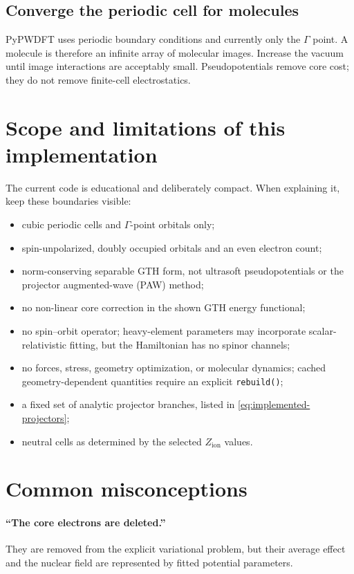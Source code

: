 \documentclass[10pt,twocolumn]{article}
\newcommand{\zion}{Z_{\mathrm{ion}}}
\newcommand{\code}[1]{\texttt{#1}}
\begin{document}
\subsection{Converge the periodic cell for molecules}

PyPWDFT uses periodic boundary conditions and currently only the
\(\Gamma\) point.  A molecule is therefore an infinite array of molecular
images.  Increase the vacuum until image interactions are acceptably small.
Pseudopotentials remove core cost; they do not remove finite-cell
electrostatics.

\section{Scope and limitations of this implementation}

The current code is educational and deliberately compact.  When explaining
it, keep these boundaries visible:
\begin{itemize}
  \item cubic periodic cells and \(\Gamma\)-point orbitals only;
  \item spin-unpolarized, doubly occupied orbitals and an even electron count;
  \item norm-conserving separable GTH form, not ultrasoft pseudopotentials or
  the projector augmented-wave (PAW) method;
  \item no non-linear core correction in the shown GTH energy functional;
  \item no spin--orbit operator; heavy-element parameters may incorporate
  scalar-relativistic fitting, but the Hamiltonian has no spinor channels;
  \item no forces, stress, geometry optimization, or molecular dynamics;
  cached geometry-dependent quantities require an explicit \code{rebuild()};
  \item a fixed set of analytic projector branches, listed in
  \cref{eq:implemented-projectors};
  \item neutral cells as determined by the selected \(\zion\) values.
\end{itemize}

\section{Common misconceptions}

\paragraph{``The core electrons are deleted.''}
They are removed from the explicit variational problem, but their average
effect and the nuclear field are represented by fitted potential parameters.
\end{document}
